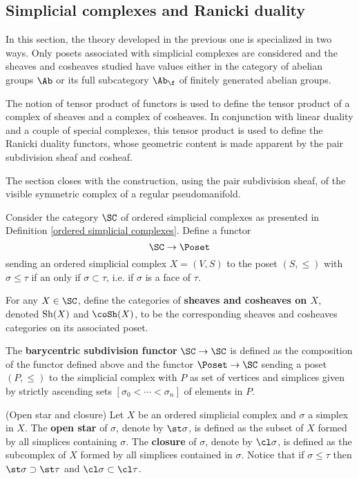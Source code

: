 \documentclass[thesis.tex]{subfiles}
\begin{document}
\subsection{Simplicial complexes and Ranicki duality}

In this section, the theory developed in the previous one is specialized in two ways. Only posets associated with simplicial complexes are considered and the sheaves and cosheaves studied have values either in the category of abelian groups $\Ab$ or its full subcategory $\Ab_{\f}$ of finitely generated abelian groups.

The notion of tensor product of functors is used to define the tensor product of a complex of sheaves and a complex of cosheaves. In conjunction with linear duality and a couple of special complexes, this tensor product is used to define the Ranicki duality functors, whose geometric content is made apparent by the pair subdivision sheaf and cosheaf.

The section closes with the construction, using the pair subdivision sheaf, of the visible symmetric complex of a regular pseudomanifold.

\begin{definition}\label{Posets <-- SC}
Consider the category $\SC$ of ordered simplicial complexes as presented in Definition \ref{ordered simplicial complexes}. Define a functor $$\SC\to\Poset$$ sending an ordered simplicial complex $X=(V,S)$ to the poset $(S,\leq)$ with $\sigma\leq\tau$ if an only if $\sigma\subset\tau$, i.e. if $\sigma$ is a face of $\tau$.

For any $X\in\SC$, define the categories of \textbf{sheaves and cosheaves on $X$}, denoted $\operatorname{Sh}(X)$ and $\coSh(X)$, to be the corresponding sheaves and cosheaves categories on its associated poset.

The \textbf{barycentric subdivision functor} $\SC\to\SC$ is defined as the composition of the functor defined above and the functor $\Poset\to\SC$ sending a poset $(P,\leq)$ to the simplicial complex with $P$ as set of vertices and simplices given by strictly ascending sets $[\sigma_0<\dotsb<\sigma_n]$ of elements in $P$.
\end{definition}

\begin{definition}(Open star and closure)
Let $X$ be an ordered simplicial complex and $\sigma$ a simplex in $X$. The \textbf{open star} of $\sigma$, denote by $\st\sigma$, is defined as the subset of $X$ formed by all simplices containing $\sigma$. The \textbf{closure} of $\sigma$, denote by $\cl\sigma$, is defined as the subcomplex of $X$ formed by all simplices contained in $\sigma$. Notice that if $\sigma\leq\tau$ then $\st\sigma\supset\st\tau$ and $\cl\sigma\subset\cl\tau$.
\end{definition}
\end{document}
